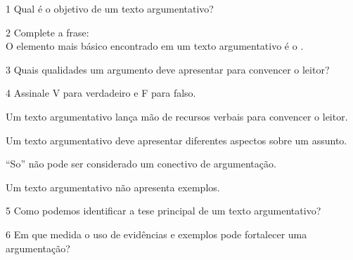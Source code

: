 
\num{1} Qual é o objetivo de um texto argumentativo?



\num{2} Complete a frase:\\
O elemento mais básico encontrado em um texto argumentativo é o \preencher.


\num{3} Quais qualidades um argumento deve apresentar para convencer o leitor?



\num{4} Assinale V para verdadeiro e F para falso.

\begin{boxlist}
\item Um texto argumentativo lança mão de recursos verbais para
convencer o leitor. 

\item Um texto argumentativo deve apresentar diferentes aspectos sobre
um assunto. 

\item ``So'' não pode ser considerado um conectivo de argumentação. 

\item Um texto argumentativo não apresenta exemplos. 
\end{boxlist}

\num{5} Como podemos identificar a tese principal de um texto argumentativo?



\num{6} Em que medida o uso de evidências e exemplos pode fortalecer uma argumentação?




